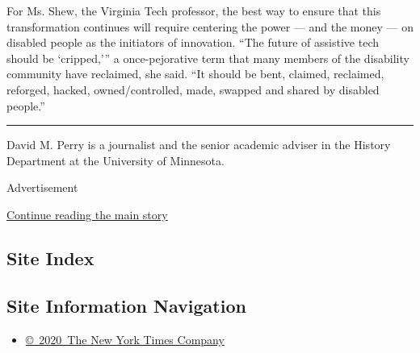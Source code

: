 For Ms. Shew, the Virginia Tech professor, the best way to ensure that
this transformation continues will require centering the power --- and
the money --- on disabled people as the initiators of innovation. ``The
future of assistive tech should be `cripped,''' a once-pejorative term
that many members of the disability community have reclaimed, she said.
``It should be bent, claimed, reclaimed, reforged, hacked,
owned/controlled, made, swapped and shared by disabled people.''

\begin{center}\rule{0.5\linewidth}{\linethickness}\end{center}

David M. Perry is a journalist and the senior academic adviser in the
History Department at the University of Minnesota.

Advertisement

\protect\hyperlink{after-bottom}{Continue reading the main story}

\hypertarget{site-index}{%
\subsection{Site Index}\label{site-index}}

\hypertarget{site-information-navigation}{%
\subsection{Site Information
Navigation}\label{site-information-navigation}}

\begin{itemize}
\tightlist
\item
  \href{https://help.nytimes3xbfgragh.onion/hc/en-us/articles/115014792127-Copyright-notice}{©~2020~The
  New York Times Company}
\end{itemize}

